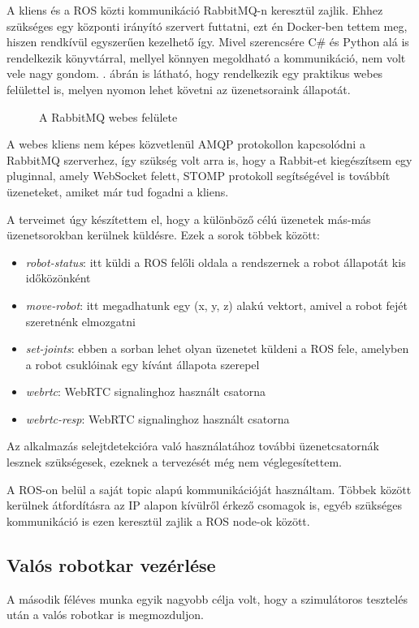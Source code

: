 \documentclass[11pt,a4paper,oneside]{article}
\newcommand{\Afigref}[1]{\Aref{fig:#1}.}
\newcommand{\insertfig}[4]{
	\vspace*{2mm}
	\begin{figure}[#4]
		\center
		\resizebox{#3}{!}{\texttt{[image: images/\#1]}}
		\parbox{0.8\textwidth}{\vspace*{4mm}\caption{{#2}}\small\label{fig:#1}}
	\end{figure}
	\vspace*{-2\parskip}
}
\begin{document}
A kliens és a ROS közti kommunikáció RabbitMQ-n keresztül zajlik. Ehhez szükséges egy központi irányító szervert futtatni, ezt én Docker-ben tettem meg, hiszen rendkívül egyszerűen kezelhető így. Mivel szerencsére C\# és Python alá is rendelkezik könyvtárral, mellyel könnyen megoldható a kommunikáció, nem volt vele nagy gondom. \Afigref{rabbit_queue} ábrán is látható, hogy rendelkezik egy praktikus webes felülettel is, melyen nyomon lehet követni az üzenetsoraink állapotát.

\insertfig{rabbit_queue}{A RabbitMQ webes felülete}{14cm}{h!}

A webes kliens nem képes közvetlenül AMQP protokollon kapcsolódni a RabbitMQ szerverhez, így szükség volt arra is, hogy a Rabbit-et kiegészítsem egy pluginnal, amely WebSocket felett, STOMP protokoll segítségével is továbbít üzeneteket, amiket már tud fogadni a kliens.

A terveimet úgy készítettem el, hogy a különböző célú üzenetek más-más üzenetsorokban kerülnek küldésre. Ezek a sorok többek között:
\begin{itemize}
  \item \emph{robot-status}: itt küldi a ROS felőli oldala a rendszernek a robot állapotát kis időközönként
  \item \emph{move-robot}: itt megadhatunk egy (x, y, z) alakú vektort, amivel a robot fejét szeretnénk elmozgatni
  \item \emph{set-joints}: ebben a sorban lehet olyan üzenetet küldeni a ROS fele, amelyben a robot csuklóinak egy kívánt állapota szerepel
  \item \emph{webrtc}: WebRTC signalinghoz használt csatorna
  \item \emph{webrtc-resp}: WebRTC signalinghoz használt csatorna
\end{itemize}

Az alkalmazás selejtdetekcióra való használatához további üzenetcsatornák lesznek szükségesek, ezeknek a tervezését még nem véglegesítettem.

A ROS-on belül a saját topic alapú kommunikációját használtam. Többek között kerülnek átfordításra az IP alapon kívülről érkező csomagok is, egyéb szükséges kommunikáció is ezen keresztül zajlik a ROS node-ok között.

\subsection{Valós robotkar vezérlése}

A második féléves munka egyik nagyobb célja volt, hogy a szimulátoros tesztelés után a valós robotkar is megmozduljon.
\end{document}
